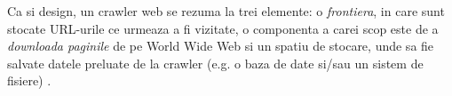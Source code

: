 Ca si design, un crawler web se rezuma la trei elemente: o \textit{frontiera}, in care sunt stocate URL-urile ce urmeaza a fi vizitate, o componenta a carei scop este de a \textit{downloada paginile} de pe World Wide Web si un spatiu de stocare, unde sa fie salvate datele preluate de la crawler (e.g. o baza de date si/sau un sistem de fisiere) \cite{Pantil, GautamPadminiFilippo}.
\\